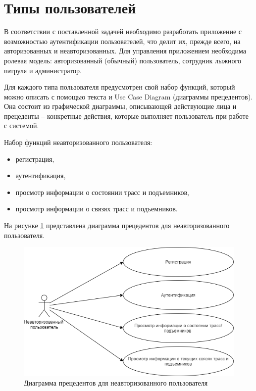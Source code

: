 \section{Типы пользователей}\label{functions}

В соответствии с поставленной задачей необходимо разработать приложение с возможностью аутентификации пользователей, что делит их, прежде всего, на авторизованных и неавторизованных. Для управления приложением необходима ролевая модель: авторизованный (обычный) пользователь, сотрудник лыжного патруля и администратор. 

Для каждого типа пользователя предусмотрен свой набор функций, который можно описать с помощью текста и Use Case Diagram (диаграммы прецедентов). Она состоит из графической диаграммы, описывающей действующие лица и прецеденты – конкретные действия, которые выполняет пользователь при работе с системой.

\clearpage
Набор функций неавторизованного пользователя:
	\begin{itemize}
		\item регистрация,
		\item аутентификация,
		\item просмотр информации о состоянии трасс и подъемников,
		\item просмотр информации о связях трасс и подъемников.
	\end{itemize}

На рисунке \ref{img:use_case1} представлена диаграмма прецедентов  для неавторизованного пользователя.
\begin{figure}[h!]
	\begin{center}
		\includegraphics[scale=0.7]{../imgs/use_case/use-case1.png}
	\end{center}
	\captionsetup{justification=centering}
	\caption{Диаграмма прецедентов для неавторизованного пользователя}
	\label{img:use_case1}
\end{figure}
	
